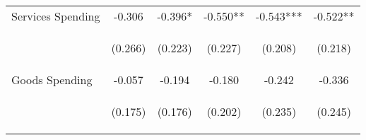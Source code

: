 \begin{tabular}{lccccc}
    Services Spending & -0.306 & -0.396* & -0.550** & -0.543*** & -0.522** \\
    \vspace{4pt} & \begin{footnotesize}(0.266)\end{footnotesize} & \begin{footnotesize}(0.223)\end{footnotesize} & \begin{footnotesize}(0.227)\end{footnotesize} & \begin{footnotesize}(0.208)\end{footnotesize} & \begin{footnotesize}(0.218)\end{footnotesize} \\
    Goods Spending & -0.057 & -0.194 & -0.180 & -0.242 & -0.336 \\
     & \begin{footnotesize}(0.175)\end{footnotesize} & \begin{footnotesize}(0.176)\end{footnotesize} & \begin{footnotesize}(0.202)\end{footnotesize} & \begin{footnotesize}(0.235)\end{footnotesize} & \begin{footnotesize}(0.245)\end{footnotesize} \\


\end{tabular}
